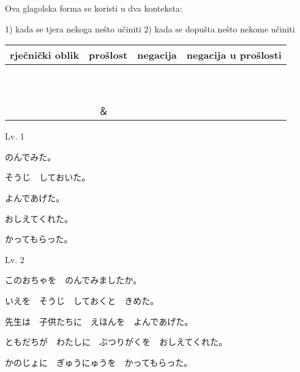 
\author{Tomislav Mamić}

	
	Ova glagolska forma se koristi u dva konteksta:

	1) kada se tjera nekoga nešto učiniti
	2) kada se dopušta nešto nekome učiniti
	
	\begin{table}[h]
		\centering
		\begin{tabular}{l l l l}\toprule[2pt]
			rječnički oblik & prošlost & negacija & negacija u prošlosti\\
			\midrule
			 & \\
			 & \\
			 &  \\\vspace{5pt}
			 &  \\
			 &  \\
			 &  \\\vspace{5pt}
			 &  \\
			 &  \\
			 &  \\
			 &  \\
			　& 
			　＆　
			\bottomrule[2pt]
		\end{tabular}
	\end{table}
	
	
	\begin{mondai}{Lv. 1}
		\item のんでみた。
		\item そうじ　しておいた。
		\item よんであげた。
		\item おしえてくれた。
		\item かってもらった。
	\end{mondai}

	\begin{mondai}{Lv. 2}
		\item このおちゃを　のんでみましたか。
		\item いえを　そうじ　しておくと　きめた。
		\item 先生は　子供たちに　えほんを　よんであげた。
		\item ともだちが　わたしに　ぶつりがくを　おしえてくれた。
		\item かのじょに　ぎゅうにゅうを　かってもらった。
	\end{mondai}

